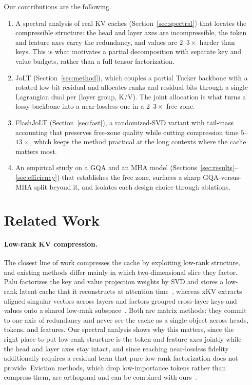 \documentclass{article}
\begin{document}
Our contributions are the following.
\begin{enumerate}
  \item A spectral analysis of real KV caches (Section~\ref{sec:spectral}) that locates the compressible structure: the head and layer axes are incompressible, the token and feature axes carry the redundancy, and values are $2$--$3\times$ harder than keys. This is what motivates a partial decomposition with separate key and value budgets, rather than a full tensor factorization.
  \item JoLT (Section~\ref{sec:method}), which couples a partial Tucker backbone with a rotated low-bit residual and allocates ranks and residual bits through a single Lagrangian dual per (layer group, K/V). The joint allocation is what turns a lossy backbone into a near-lossless one in a $2$--$3\times$ free zone.
  \item FlashJoLT (Section~\ref{sec:fast}), a randomized-SVD variant with tail-mass accounting that preserves free-zone quality while cutting compression time $5$--$13\times$, which keeps the method practical at the long contexts where the cache matters most.
  \item An empirical study on a GQA and an MHA model (Sections~\ref{sec:results}--\ref{sec:efficiency}) that establishes the free zone, surfaces a sharp GQA-versus-MHA split beyond it, and isolates each design choice through ablations.
\end{enumerate}

\section{Related Work}
\paragraph{Low-rank KV compression.} The closest line of work compresses the cache by exploiting low-rank structure, and existing methods differ mainly in which two-dimensional slice they factor. Palu factorizes the key and value projection weights by SVD and stores a low-rank latent cache that it reconstructs at attention time~\citep{chang2024palu}, whereas xKV extracts aligned singular vectors across layers and factors grouped cross-layer keys and values onto a shared low-rank subspace~\citep{chang2025xkv}. Both are matrix methods: they commit to one axis of redundancy and never see the cache as a single object across heads, tokens, and features. Our spectral analysis shows why this matters, since the right place to put low-rank structure is the token and feature axes jointly while the head and layer axes stay intact, and since reaching near-lossless fidelity additionally requires a residual term that pure low-rank factorization does not provide. Eviction methods, which drop low-importance tokens rather than compress them, are orthogonal and can be combined with ours~\citep{zhang2023h2o,xiao2024streamingllm,li2024snapkv}.
\end{document}
